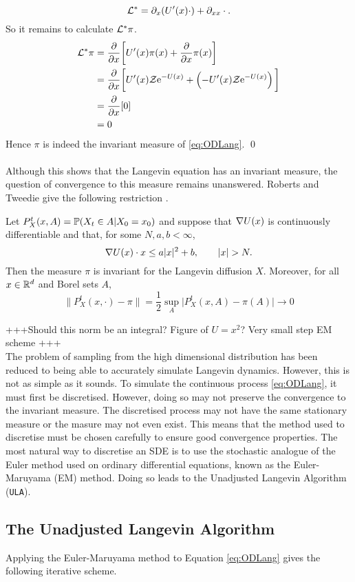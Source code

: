 \[\L^* = \partial_x(U'(x)\cdot)+\partial_{xx}\cdot . \]
So it remains to calculate \(\L^*\pi\). 
\begin{align*}
\L^*\pi &= \pd{}{x}\bigg\lbrack U'(x)\pi(x) + \pd{}{x}\pi(x)\bigg\rbrack\\
		&= \pd{}{x}\bigg\lbrack U'(x)\mathcal{Z}\e^{-U(x)}+ \left(-U'(x)\mathcal{Z}\e^{-U(x)}\right)\bigg\rbrack\\
		&= \pd{}{x}\lbrack 0 \rbrack\\
		&= 0
\end{align*}
Hence \(\pi\) is indeed the invariant measure of \eqref{eq:ODLang}. \qed 
\\
\\
Although this shows that the Langevin equation has an invariant measure, the question of convergence to this measure remains unanswered. Roberts and Tweedie give the following restriction \cite{RT_MALA}.
\begin{theorem}
	Let \(P^t_X(x,A) = \P(X_t\in A | X_0 =x_0)\) and suppose that \(\grad U(x)\) is continuously differentiable and that, for some \(N,a,b < \infty\),
	\[\grad U(x)\cdot x \leq a|x|^2 + b, \qquad |x|>N. \]
	Then the measure \(\pi\) is invariant for the Langevin diffusion \(X\). Moreover, for all \(x \in \R^d \) and Borel sets \(A\),
	\[\|P^t_X(x,\cdot) - \pi \| = \frac{1}{2}\sup_A \big|P^t_X(x,A)-\pi(A)\big| \to 0\]

\end{theorem}
+++Should this norm be an integral? Figure of \(U=x^2\)? Very small step EM scheme +++\\
The problem of sampling from the high dimensional distribution has been reduced to being able to accurately simulate Langevin dynamics. However, this is not as simple as it sounds. To simulate the continuous process  \eqref{eq:ODLang}, it must first be discretised. However, doing so may not preserve the convergence to the invariant measure. The discretised process may not have the same stationary measure or the masure may not even exist. This means that the method used to discretise must be chosen carefully to ensure good convergence properties. The most natural way to discretise an SDE is to use the stochastic analogue of the Euler method used on ordinary differential equations, known as the Euler-Maruyama (EM) method. Doing so leads to the Unadjusted Langevin Algorithm (\texttt{ULA}).

\subsection{The Unadjusted Langevin Algorithm}
Applying the Euler-Maruyama method to Equation \eqref{eq:ODLang} gives the following iterative scheme.


